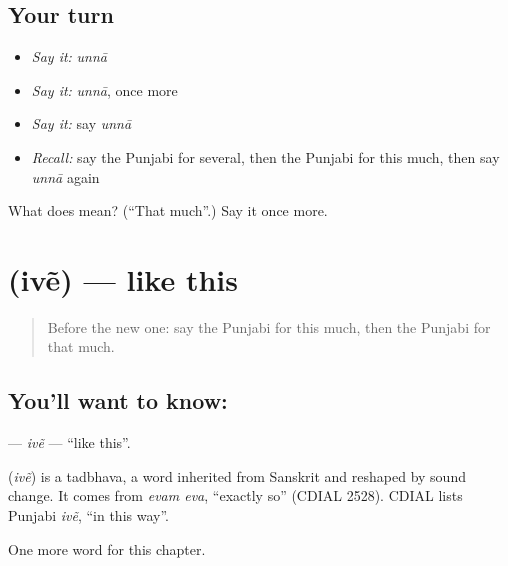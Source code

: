 \subsection*{Your turn}
\begin{itemize}
\raggedright
  \item \emph{Say it:} \emph{unnā}
  \item \emph{Say it:} \emph{unnā}, once more
  \item \emph{Say it:} say \emph{unnā}
  \item \emph{Recall:} say the Punjabi for several, then the Punjabi for this much, then say \emph{unnā} again
\end{itemize}

\begin{tcolorbox}[breakable,colback=teal!4,colframe=teal!35!black,title={Before you move on}]
What does  mean? (\textquotedblleft{}That much\textquotedblright{}.) Say it once more.
\end{tcolorbox}
\section[\texorpdfstring{\pa{ਇਵੇਂ} (ivẽ)}{ਇਵੇਂ (ivẽ)}]{ (ivẽ) — like this}

\label{lesson:PA-C108-ive}



\begin{quote}
Before the new one: say the Punjabi for this much, then the Punjabi for that much.
\end{quote}

\subsection*{You'll want to know: }
\textbf{} — \emph{ivẽ} — \textquotedblleft{}like this\textquotedblright{}.

\begin{cousinweb}
\textbf{} (\emph{ivẽ}) is a tadbhava, a word inherited from Sanskrit and reshaped by sound change. It comes from \emph{evam eva}, \textquotedblleft{}exactly so\textquotedblright{} (CDIAL 2528). CDIAL lists Punjabi \emph{ivẽ}, \textquotedblleft{}in this way\textquotedblright{}.
\end{cousinweb}

\begin{grammarlens}[title={What you've built}]
One more word for this chapter.
\end{grammarlens}

